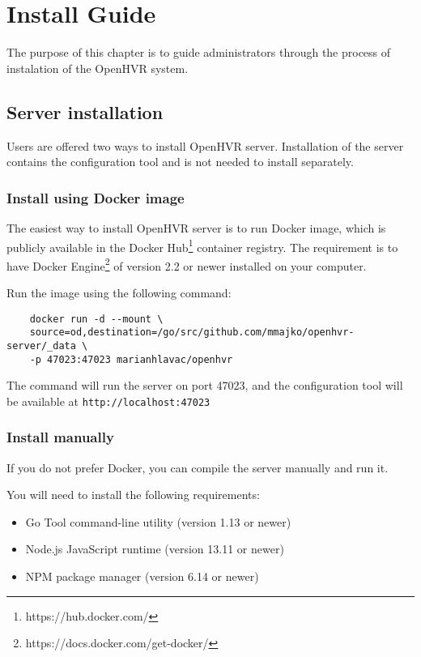 \chapter{Install Guide}

The purpose of this chapter is to guide administrators through the process
of instalation of the OpenHVR system.

\section*{Server installation}

Users are offered two ways to install OpenHVR server. Installation of the
server contains the configuration tool and is not needed to install separately.

\subsection*{Install using Docker image}

The easiest way to install OpenHVR server is to run Docker image, which is
publicly available in the Docker Hub\footnote{https://hub.docker.com/}
container registry. The requirement is to have Docker 
Engine\footnote{https://docs.docker.com/get-docker/} of version 2.2 or
newer installed on your computer. 

Run the image using the following command:

\begin{verbatim}
    docker run -d --mount \
    source=od,destination=/go/src/github.com/mmajko/openhvr-server/_data \
    -p 47023:47023 marianhlavac/openhvr
\end{verbatim}

The command will run the server on port 47023, and the configuration tool will
be available at \verb|http://localhost:47023|

\subsection*{Install manually}

If you do not prefer Docker, you can compile the server manually and run it.

You will need to install the following requirements:

\begin{itemize}
    \item Go Tool command-line utility (version 1.13 or newer)
    \item Node.js JavaScript runtime (version 13.11 or newer) 
    \item NPM package manager (version 6.14 or newer)
\end{itemize}

